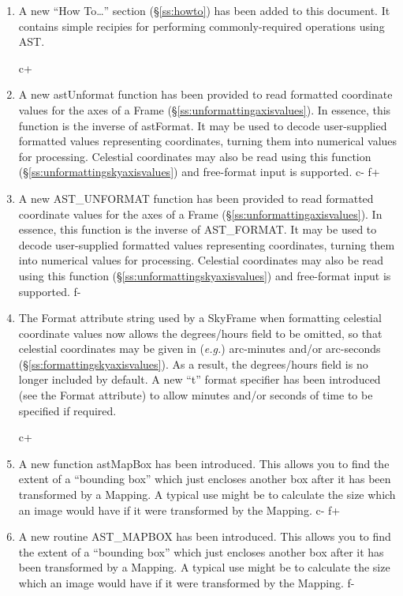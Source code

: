 \documentclass[twoside,11pt]{starlink}
\providecommand{\secref}[1]{\S\ref{#1}}
\begin{document}
\begin{enumerate}

\item A new ``How To\ldots'' section (\secref{ss:howto}) has been
added to this document. It contains simple recipies for performing
commonly-required operations using AST.

c+
\item A new astUnformat function has been provided to read formatted
coordinate values for the axes of a Frame
(\secref{ss:unformattingaxisvalues}). In essence, this function is the
inverse of astFormat. It may be used to decode user-supplied formatted
values representing coordinates, turning them into numerical values
for processing. Celestial coordinates may also be read using this
function (\secref{ss:unformattingskyaxisvalues}) and free-format input
is supported.
c-
f+
\item A new AST\_UNFORMAT function has been provided to read formatted
coordinate values for the axes of a Frame
(\secref{ss:unformattingaxisvalues}). In essence, this function is the
inverse of AST\_FORMAT. It may be used to decode user-supplied
formatted values representing coordinates, turning them into numerical
values for processing.  Celestial coordinates may also be read using
this function (\secref{ss:unformattingskyaxisvalues}) and free-format
input is supported.
f-

\item The Format attribute string used by a SkyFrame when formatting
celestial coordinate values now allows the degrees/hours field to be
omitted, so that celestial coordinates may be given in (\emph{e.g.})
arc-minutes and/or arc-seconds
(\secref{ss:formattingskyaxisvalues}). As a result, the degrees/hours
field is no longer included by default.  A new ``t'' format specifier
has been introduced (see the Format attribute) to allow minutes and/or
seconds of time to be specified if required.

c+
\item A new function astMapBox has been introduced. This allows you to
find the extent of a ``bounding box'' which just encloses another box
after it has been transformed by a Mapping. A typical use might be to
calculate the size which an image would have if it were transformed by
the Mapping.
c-
f+
\item A new routine AST\_MAPBOX has been introduced. This allows you
to find the extent of a ``bounding box'' which just encloses another
box after it has been transformed by a Mapping. A typical use might be
to calculate the size which an image would have if it were transformed
by the Mapping.
f-


\end{enumerate}
\end{document}
